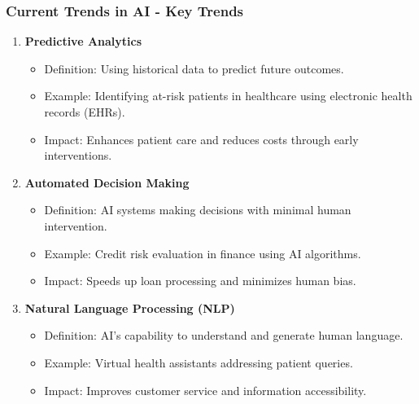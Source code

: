 \documentclass[aspectratio=169]{beamer}
\begin{document}
\begin{frame}[fragile]
    \frametitle{Current Trends in AI - Key Trends}
    \begin{enumerate}
        \item \textbf{Predictive Analytics}
            \begin{itemize}
                \item Definition: Using historical data to predict future outcomes.
                \item Example: Identifying at-risk patients in healthcare using electronic health records (EHRs).
                \item Impact: Enhances patient care and reduces costs through early interventions.
            \end{itemize}
        \item \textbf{Automated Decision Making}
            \begin{itemize}
                \item Definition: AI systems making decisions with minimal human intervention.
                \item Example: Credit risk evaluation in finance using AI algorithms.
                \item Impact: Speeds up loan processing and minimizes human bias.
            \end{itemize}
        \item \textbf{Natural Language Processing (NLP)}
            \begin{itemize}
                \item Definition: AI's capability to understand and generate human language.
                \item Example: Virtual health assistants addressing patient queries.
                \item Impact: Improves customer service and information accessibility.
            \end{itemize}
    \end{enumerate}
\end{frame}
\end{document}
